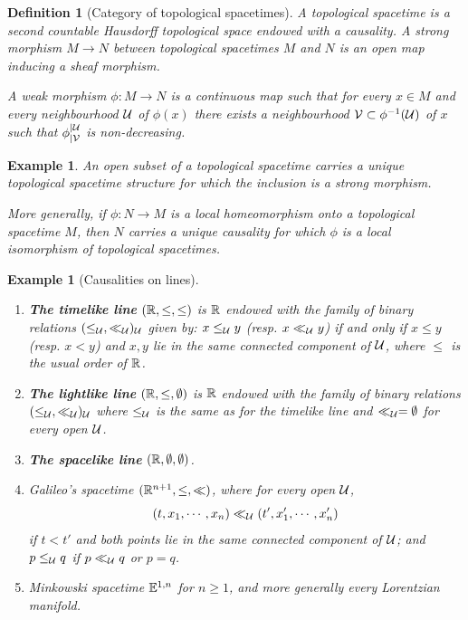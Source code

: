 \documentclass[a4paper,twoside]{article}
\newtheorem{defi}[lem]{Definition}
\newtheorem{exemple}[lem]{Example}
\begin{document}
		\begin{defi}[Category of topological spacetimes]\label{def:category_topological_spacetimes}
			A topological spacetime is a second countable Hausdorff topological space endowed with a causality. A strong morphism $M\rightarrow N$ between topological spacetimes $M$ and $N$ is an open map inducing a sheaf morphism.

			A weak morphism $\phi:M\rightarrow N$ is a continuous map such that for every $x\in M$ and every neighbourhood $\mathcal{U}$ of $\phi(x)$ there exists a neighbourhood $\mathcal V\subset \phi^{-1}(\mathcal{U})$ of $x$ such that $\phi_{|\mathcal V}^{|\mathcal{U}}$ is non-decreasing.
		\end{defi}
		\begin{exemple}\label{ex:open_subset}
		 An open subset of a topological spacetime carries a unique topological spacetime structure for which the inclusion is a strong morphism.

		 More generally, if $\phi:N\rightarrow M$ is a local homeomorphism onto a topological spacetime $M$, then $N$ carries a unique causality for which $\phi$ is a local isomorphism of topological spacetimes.
		\end{exemple}

		\begin{exemple}[Causalities on lines]\label{ex:causalities_lines}
		\begin{enumerate}
			\item \textbf{The timelike line}
				$(\mathbb R,\leq,\leq)$ is $\mathbb R$ endowed with the family of binary relations $(\leq_{\mathcal{U}},\ll_{\mathcal{U}})_{\mathcal{U}}$ given by:
				$x\leq_{\mathcal{U}} y$ (resp. $x\ll_{\mathcal{U}} y$) if and only if $x\leq y$ (resp. $x< y$) and $x,y$ lie in the same connected component of $\mathcal{U}$, where $\leq$ is the usual order of $\mathbb R$.
			\item
				\textbf{The lightlike line} $(\mathbb R,\leq,\emptyset)$ is $\mathbb R$ endowed with the family of binary relations $(\leq_{\mathcal{U}},\ll_{\mathcal{U}})_{\mathcal{U}}$ where $\leq_{\mathcal{U}}$ is the same as for the timelike line and $\ll_{\mathcal{U}}=\emptyset$ for every open $\mathcal{U}$.
			\item \textbf{The spacelike line} $(\mathbb R,\emptyset,\emptyset)$.
			\item Galileo's spacetime $(\mathbb R^{n+1},\leq,\ll)$, where for every open $\mathcal{U}$,
				$$(t,x_1,\cdots,x_n)\ll_{\mathcal{U}}  (t',x_1',\cdots,x_n')$$ if $t<t'$ and both points lie in the same connected component of $\mathcal{U}$; and $p\leq_{\mathcal{U}} q$ if $p\ll_{\mathcal{U}} q$ or $p=q$.
			\item
				Minkowski spacetime $\mathbb{E}^{1,n}$ for $n\geq1$, and more generally every Lorentzian manifold.
		\end{enumerate}
		\end{exemple}
\end{document}
